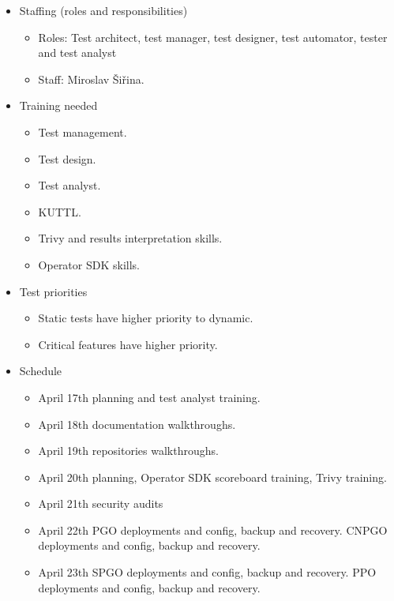 \begin{itemize}
\begin{itemize}
          \item Staffing (roles and responsibilities)
                \begin{itemize}
                  \item Roles: Test architect, test manager, test designer, test automator, tester and test analyst
                  \item Staff: Miroslav Šiřina.
                \end{itemize}
          \item Training needed
                \begin{itemize}
                  \item Test management.
                  \item Test design.
                  \item Test analyst.
                  \item KUTTL.
                  \item Trivy and results interpretation skills.
                  \item Operator SDK skills.
                \end{itemize}
          \item Test priorities
                \begin{itemize}
                  \item Static tests have higher priority to dynamic.
                  \item Critical features have higher priority.
                \end{itemize}
          \item Schedule
                \begin{itemize}
                  \item April 17th planning and test analyst training.
                  \item April 18th documentation walkthroughs.
                  \item April 19th repositories walkthroughs.
                  \item April 20th planning, Operator SDK scoreboard training, Trivy training.
                  \item April 21th security audits
                  \item April 22th PGO deployments and config, backup and recovery. CNPGO deployments and config, backup and recovery.
                  \item April 23th SPGO deployments and config, backup and recovery. PPO deployments and config, backup and recovery.

\end{itemize}
\end{itemize}
\end{itemize}
